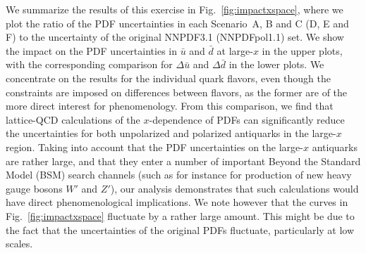 We summarize the results of this exercise in Fig.~\ref{fig:impactxspace}, 
where we plot the ratio of the PDF uncertainties in each Scenario~A, B and C 
(D, E and F) to the uncertainty of the original
NNPDF3.1 (NNPDFpol1.1) set.
%
We show the impact on the PDF uncertainties
in $\bar{u}$ and $\bar{d}$ at large-$x$ in the upper
plots, with the corresponding comparison for $\Delta\bar{u}$
and $\Delta\bar{d}$ in the lower plots.
%
We concentrate on the results for the individual quark flavors, even though 
the constraints are imposed on differences between flavors, as the former are 
of the more direct interest for phenomenology. 
%
From this comparison, we find that lattice-QCD calculations of the 
$x$-dependence of PDFs can significantly reduce the uncertainties for both 
unpolarized and polarized antiquarks in the large-$x$ region.
%
Taking into account that the PDF uncertainties on the large-$x$
antiquarks are rather large, and that they
enter a number of important Beyond the Standard Model (BSM) search channels
(such as for instance for production of new heavy gauge bosons $W'$ and $Z'$),
our analysis demonstrates that such calculations would have direct
phenomenological implications.
%
We note however that the curves in Fig.~\ref{fig:impactxspace}
fluctuate by a rather large amount.
%
This might be due to the fact that the uncertainties of the original PDFs
fluctuate, particularly at low scales.

